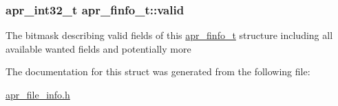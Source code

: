 \subsubsection[{\texorpdfstring{valid}{valid}}]{\setlength{\rightskip}{0pt plus 5cm}apr\+\_\+int32\+\_\+t apr\+\_\+finfo\+\_\+t\+::valid}\hypertarget{structapr__finfo__t_aff0cdf06637edec63c4701e582792019}{}\label{structapr__finfo__t_aff0cdf06637edec63c4701e582792019}
The bitmask describing valid fields of this \hyperlink{structapr__finfo__t}{apr\+\_\+finfo\+\_\+t} structure including all available \textquotesingle{}wanted\textquotesingle{} fields and potentially more 

The documentation for this struct was generated from the following file\+:\begin{DoxyCompactItemize}
\item 
\hyperlink{apr__file__info_8h}{apr\+\_\+file\+\_\+info.\+h}\end{DoxyCompactItemize}

